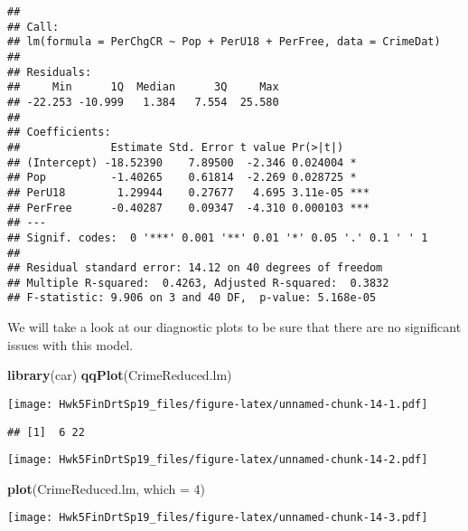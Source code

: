 \documentclass[]{article}
\newenvironment{Shaded}{\begin{snugshade}}{\end{snugshade}}
\newcommand{\KeywordTok}[1]{\textcolor[rgb]{0.13,0.29,0.53}{\textbf{#1}}}
\newcommand{\DataTypeTok}[1]{\textcolor[rgb]{0.13,0.29,0.53}{#1}}
\newcommand{\DecValTok}[1]{\textcolor[rgb]{0.00,0.00,0.81}{#1}}
\newcommand{\OperatorTok}[1]{\textcolor[rgb]{0.81,0.36,0.00}{\textbf{#1}}}
\newcommand{\NormalTok}[1]{#1}
\begin{document}
\begin{verbatim}
## 
## Call:
## lm(formula = PerChgCR ~ Pop + PerU18 + PerFree, data = CrimeDat)
## 
## Residuals:
##     Min      1Q  Median      3Q     Max 
## -22.253 -10.999   1.384   7.554  25.580 
## 
## Coefficients:
##              Estimate Std. Error t value Pr(>|t|)    
## (Intercept) -18.52390    7.89500  -2.346 0.024004 *  
## Pop          -1.40265    0.61814  -2.269 0.028725 *  
## PerU18        1.29944    0.27677   4.695 3.11e-05 ***
## PerFree      -0.40287    0.09347  -4.310 0.000103 ***
## ---
## Signif. codes:  0 '***' 0.001 '**' 0.01 '*' 0.05 '.' 0.1 ' ' 1
## 
## Residual standard error: 14.12 on 40 degrees of freedom
## Multiple R-squared:  0.4263, Adjusted R-squared:  0.3832 
## F-statistic: 9.906 on 3 and 40 DF,  p-value: 5.168e-05
\end{verbatim}

We will take a look at our diagnostic plots to be sure that there are no
significant issues with this model.

\begin{Shaded}
\begin{Highlighting}[]
\KeywordTok{library}\NormalTok{(car)}
\KeywordTok{qqPlot}\NormalTok{(CrimeReduced.lm)}
\end{Highlighting}
\end{Shaded}

\texttt{[image: Hwk5FinDrtSp19\_files/figure-latex/unnamed-chunk-14-1.pdf]}

\begin{verbatim}
## [1]  6 22
\end{verbatim}

\begin{Shaded}
\end{Shaded}

\texttt{[image: Hwk5FinDrtSp19\_files/figure-latex/unnamed-chunk-14-2.pdf]}

\begin{Shaded}
\begin{Highlighting}[]
\KeywordTok{plot}\NormalTok{(CrimeReduced.lm, }\DataTypeTok{which =} \DecValTok{4}\NormalTok{)}
\end{Highlighting}
\end{Shaded}

\texttt{[image: Hwk5FinDrtSp19\_files/figure-latex/unnamed-chunk-14-3.pdf]}
\end{document}
